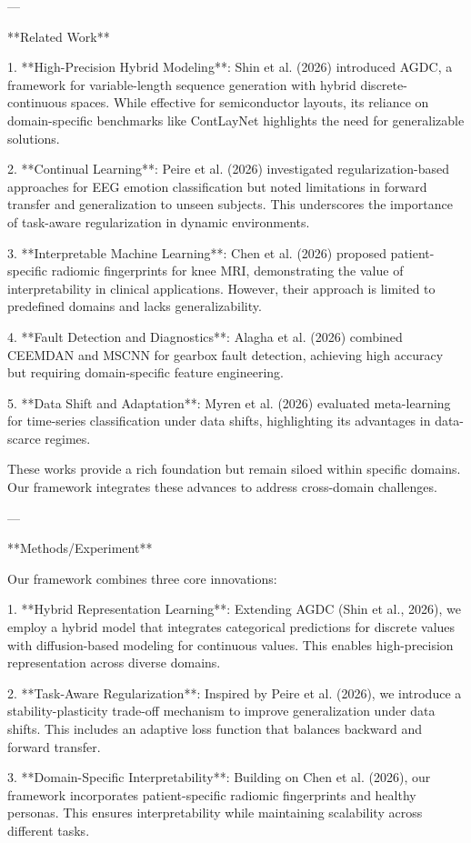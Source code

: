 ---

**Related Work**

1. **High-Precision Hybrid Modeling**: Shin et al. (2026) introduced AGDC, a framework for variable-length sequence generation with hybrid discrete-continuous spaces. While effective for semiconductor layouts, its reliance on domain-specific benchmarks like ContLayNet highlights the need for generalizable solutions.

2. **Continual Learning**: Peire et al. (2026) investigated regularization-based approaches for EEG emotion classification but noted limitations in forward transfer and generalization to unseen subjects. This underscores the importance of task-aware regularization in dynamic environments.

3. **Interpretable Machine Learning**: Chen et al. (2026) proposed patient-specific radiomic fingerprints for knee MRI, demonstrating the value of interpretability in clinical applications. However, their approach is limited to predefined domains and lacks generalizability.

4. **Fault Detection and Diagnostics**: Alagha et al. (2026) combined CEEMDAN and MSCNN for gearbox fault detection, achieving high accuracy but requiring domain-specific feature engineering.

5. **Data Shift and Adaptation**: Myren et al. (2026) evaluated meta-learning for time-series classification under data shifts, highlighting its advantages in data-scarce regimes.

These works provide a rich foundation but remain siloed within specific domains. Our framework integrates these advances to address cross-domain challenges.

---

**Methods/Experiment**

Our framework combines three core innovations:

1. **Hybrid Representation Learning**: Extending AGDC (Shin et al., 2026), we employ a hybrid model that integrates categorical predictions for discrete values with diffusion-based modeling for continuous values. This enables high-precision representation across diverse domains.

2. **Task-Aware Regularization**: Inspired by Peire et al. (2026), we introduce a stability-plasticity trade-off mechanism to improve generalization under data shifts. This includes an adaptive loss function that balances backward and forward transfer.

3. **Domain-Specific Interpretability**: Building on Chen et al. (2026), our framework incorporates patient-specific radiomic fingerprints and healthy personas. This ensures interpretability while maintaining scalability across different tasks.

